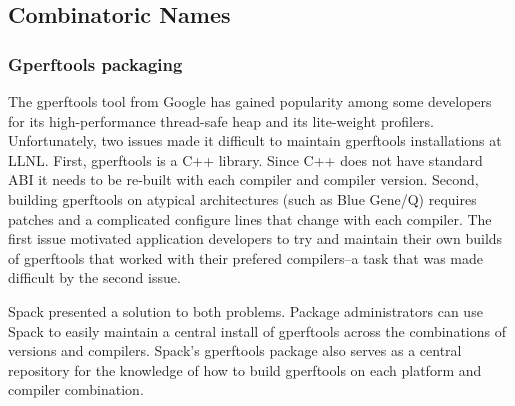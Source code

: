 
\subsection{Combinatoric Names}
\label{sec:usecase-combinatoric}


\subsubsection{Gperftools packaging}

The gperftools tool from Google has gained popularity among some developers for
its high-performance thread-safe heap and its lite-weight profilers.  
Unfortunately, two issues made it difficult to maintain gperftools installations 
at LLNL.  First, gperftools is a C++ library.  Since C++ does not have standard 
ABI it needs to be re-built with each compiler and compiler version.  Second, 
building gperftools on atypical architectures (such as Blue Gene/Q) requires 
patches and a complicated configure lines that change with each compiler.  The 
first issue motivated application developers to try and maintain their own builds 
of gperftools that worked with their prefered compilers--a task that was made 
difficult by the second issue.

Spack presented a solution to both problems.  Package administrators can use Spack to 
easily maintain a central install of gperftools across the combinations of versions 
and compilers.  Spack's gperftools package also serves as a central repository for 
the knowledge of how to build gperftools on each platform and compiler combination.  

